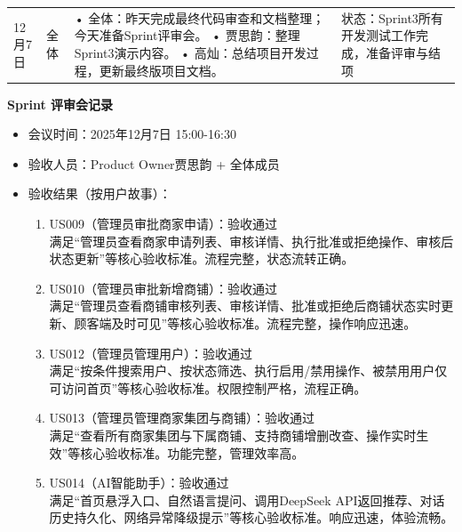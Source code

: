 \begin{levellist}
\begin{longtable}{>{\centering\arraybackslash}m{1cm} >{\centering\arraybackslash}m{1cm} >{\centering\arraybackslash}m{9cm} >{\centering\arraybackslash}m{2.5cm}}
        12月7日                                                                                          & 全体                             & • 全体：昨天完成最终代码审查和文档整理；今天准备Sprint评审会。 \newline
        • 贾思韵：整理Sprint3演示内容。 \newline
        • 高灿：总结项目开发过程，更新最终版项目文档。                                                                       & 状态：Sprint3所有开发测试工作完成，准备评审与结项                                                                                         \\
    \end{longtable}

    \item \textbf{Sprint 评审会记录}
    \begin{itemize}
        \item 会议时间：2025年12月7日 15:00-16:30
        \item 验收人员：Product Owner贾思韵 + 全体成员
        \item 验收结果（按用户故事）：
              \begin{enumerate}
                  \item US009（管理员审批商家申请）：验收通过 \\
                        满足“管理员查看商家申请列表、审核详情、执行批准或拒绝操作、审核后状态更新”等核心验收标准。流程完整，状态流转正确。
                  \item US010（管理员审批新增商铺）：验收通过 \\
                        满足“管理员查看商铺审核列表、审核详情、批准或拒绝后商铺状态实时更新、顾客端及时可见”等核心验收标准。流程完整，操作响应迅速。
                  \item US012（管理员管理用户）：验收通过 \\
                        满足“按条件搜索用户、按状态筛选、执行启用/禁用操作、被禁用用户仅可访问首页”等核心验收标准。权限控制严格，流程正确。
                  \item US013（管理员管理商家集团与商铺）：验收通过 \\
                        满足“查看所有商家集团与下属商铺、支持商铺增删改查、操作实时生效”等核心验收标准。功能完整，管理效率高。
                  \item US014（AI智能助手）：验收通过 \\
                        满足“首页悬浮入口、自然语言提问、调用DeepSeek API返回推荐、对话历史持久化、网络异常降级提示”等核心验收标准。响应迅速，体验流畅。

\end{enumerate}
\end{itemize}
\end{levellist}
